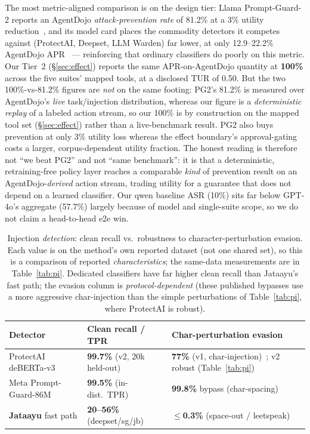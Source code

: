 \documentclass[11pt]{article}
\newcommand{\good}[1]{\textcolor{good}{\textbf{#1}}}
\newcommand{\bad}[1]{\textcolor{crit}{\textbf{#1}}}
\begin{document}
The
most metric-aligned comparison is on the design tier: Llama Prompt-Guard-2 reports an AgentDojo
\emph{attack-prevention rate} of 81.2\% at a 3\% utility reduction~\cite{promptguard}, and its
model card places the commodity detectors it competes against (ProtectAI, Deepset, LLM Warden) far
lower, at only 12.9--22.2\% AgentDojo APR~\cite{promptguard} --- reinforcing that ordinary
classifiers do poorly on this metric. Our Tier~2 (\S\ref{sec:effect}) reports the same
APR-on-AgentDojo quantity at \good{100\%} across the five suites' mapped tools, at a disclosed TUR
of 0.50. But the two 100\%-vs-81.2\% figures are \emph{not} on the
same footing: PG2's 81.2\% is measured over AgentDojo's \emph{live} task/injection distribution,
whereas our figure is a \emph{deterministic replay} of a labeled action stream, so our 100\% is by
construction on the mapped tool set (\S\ref{sec:effect}) rather
than a live-benchmark result. PG2 also buys prevention at only 3\% utility loss whereas the effect
boundary's approval-gating costs a larger, corpus-dependent utility fraction. The honest reading is
therefore not ``we beat PG2'' and not ``same benchmark'': it is that a deterministic,
retraining-free policy layer reaches a comparable \emph{kind} of prevention result on an
AgentDojo-\emph{derived} action stream, trading utility for a guarantee that does not depend on a
learned classifier. Our qwen baseline ASR (10\%) sits far below GPT-4o's aggregate (57.7\%) largely
because of model and single-suite scope, so we do not claim a head-to-head e2e win.

\begin{table}[htbp]\centering\small
\caption{Injection \emph{detection}: clean recall vs.\ robustness to character-perturbation evasion.
Each value is on the method's own reported dataset (not one shared set), so this is a comparison of
reported \emph{characteristics}; the same-data measurements are in Table~\ref{tab:pi}. Dedicated
classifiers have far higher clean recall than Jataayu's fast path; the evasion column is
\emph{protocol-dependent} (these published bypasses use a more aggressive char-injection than the
simple perturbations of Table~\ref{tab:pi}, where ProtectAI is
robust).}\label{tab:cmp-detect}
\setlength\tabcolsep{5pt}
\begin{tabular}{L{4.6cm}L{3.2cm}L{4.2cm}}
\toprule
Detector & Clean recall / TPR & Char-perturbation evasion \\
\midrule
ProtectAI deBERTa-v3~\cite{protectai} & \good{99.7\%} (v2, 20k held-out) & \bad{77\%} (v1, char-injection)~\cite{guardrails}; v2 robust (Table~\ref{tab:pi}) \\
Meta Prompt-Guard-86M~\cite{promptguard} & \good{99.5\%} (in-dist.\ TPR) & \bad{99.8\%} bypass (char-spacing)~\cite{guardrails} \\
\textbf{Jataayu} fast path & \bad{20--56\%} (deepset/sg/jb) & \good{$\le$0.3\%} (space-out / leetspeak) \\
\bottomrule
\end{tabular}
\end{table}
\end{document}
